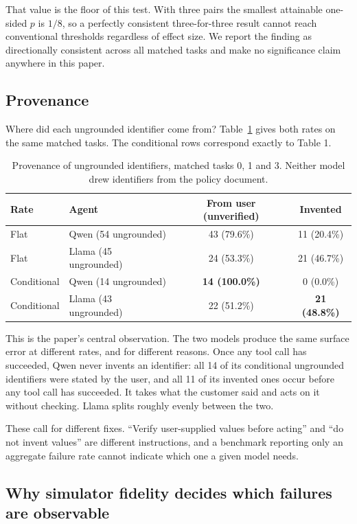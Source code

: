 \documentclass{article}
\begin{document}
That value is the floor of this test. With three pairs the smallest attainable one-sided $p$ is $1/8$, so a perfectly consistent three-for-three result cannot reach conventional thresholds regardless of effect size. We report the finding as directionally consistent across all matched tasks and make no significance claim anywhere in this paper.

\subsection{Provenance}

Where did each ungrounded identifier come from? Table~\ref{tab:prov} gives both rates on the same matched tasks. The conditional rows correspond exactly to Table 1.

\begin{table}[h]
\centering
\caption{Provenance of ungrounded identifiers, matched tasks 0, 1 and 3. Neither model drew identifiers from the policy document.}
\label{tab:prov}
\begin{tabular}{llcc}
\toprule
Rate & Agent & From user (unverified) & Invented \\
\midrule
Flat & Qwen (54 ungrounded) & 43 (79.6\%) & 11 (20.4\%) \\
Flat & Llama (45 ungrounded) & 24 (53.3\%) & 21 (46.7\%) \\
Conditional & Qwen (14 ungrounded) & \textbf{14 (100.0\%)} & 0 (0.0\%) \\
Conditional & Llama (43 ungrounded) & 22 (51.2\%) & \textbf{21 (48.8\%)} \\
\bottomrule
\end{tabular}
\end{table}

This is the paper's central observation. The two models produce the same surface error at different rates, and for different reasons. Once any tool call has succeeded, Qwen never invents an identifier: all 14 of its conditional ungrounded identifiers were stated by the user, and all 11 of its invented ones occur before any tool call has succeeded. It takes what the customer said and acts on it without checking. Llama splits roughly evenly between the two.

These call for different fixes. ``Verify user-supplied values before acting'' and ``do not invent values'' are different instructions, and a benchmark reporting only an aggregate failure rate cannot indicate which one a given model needs.

\subsection{Why simulator fidelity decides which failures are observable}
\label{sec:invisible}
\end{document}
